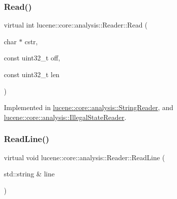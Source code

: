 \mbox{\label{classlucene_1_1core_1_1analysis_1_1Reader_a986e25a49a947dc113a22c6de033ebe9}} 
\subsubsection{\texorpdfstring{Read()}{Read()}\hspace{0.1cm}{\footnotesize\ttfamily [2/2]}}
{\footnotesize\ttfamily virtual int lucene\+::core\+::analysis\+::\+Reader\+::\+Read (\begin{DoxyParamCaption}\item[{char $\ast$}]{cstr,  }\item[{const uint32\+\_\+t}]{off,  }\item[{const uint32\+\_\+t}]{len }\end{DoxyParamCaption})\hspace{0.3cm}{\ttfamily [pure virtual]}}



Implemented in \mbox{\hyperlink{classlucene_1_1core_1_1analysis_1_1StringReader_ab048d6d6d759175eeda5321a480995c3}{lucene\+::core\+::analysis\+::\+String\+Reader}}, and \mbox{\hyperlink{classlucene_1_1core_1_1analysis_1_1IllegalStateReader_a8017ca4fc795b71e16bb87d4a24bdfa9}{lucene\+::core\+::analysis\+::\+Illegal\+State\+Reader}}.

\mbox{\label{classlucene_1_1core_1_1analysis_1_1Reader_a475ba046fd74e43a1cce4c4702c791c2}} 
\subsubsection{\texorpdfstring{Read\+Line()}{ReadLine()}}
{\footnotesize\ttfamily virtual void lucene\+::core\+::analysis\+::\+Reader\+::\+Read\+Line (\begin{DoxyParamCaption}\item[{std\+::string \&}]{line }\end{DoxyParamCaption})\hspace{0.3cm}{\ttfamily [pure virtual]}}



